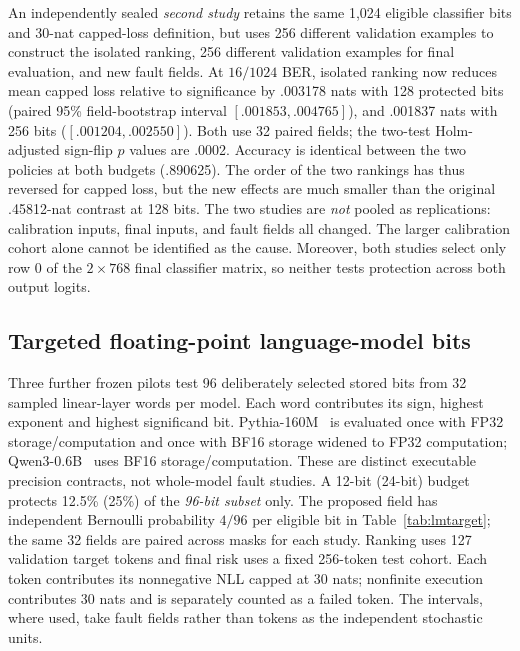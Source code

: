 An independently sealed \emph{second study} retains the same 1,024 eligible
classifier bits and 30-nat capped-loss definition, but uses 256 different
validation examples to construct the isolated ranking, 256 different validation
examples for final evaluation, and new fault fields. At $16/1024$ BER, isolated
ranking now reduces mean capped loss relative to significance by .003178 nats
with 128 protected bits (paired 95\% field-bootstrap interval
$[.001853,.004765]$), and .001837 nats with 256 bits
($[.001204,.002550]$). Both use 32 paired fields; the two-test Holm-adjusted
sign-flip $p$ values are .0002. Accuracy is identical between the two policies
at both budgets (.890625). The order of the two rankings has thus reversed
for capped loss, but the new effects are much smaller than the original
.45812-nat contrast at 128 bits. The two studies are \emph{not} pooled as
replications: calibration inputs, final inputs, and fault fields all changed.
The larger calibration cohort alone cannot be identified as the cause.
Moreover, both studies select only row 0 of the $2\times768$ final classifier
matrix, so neither tests protection across both output logits.

\subsection{Targeted floating-point language-model bits}
\label{sec:targetedlm}
Three further frozen pilots test 96 deliberately selected stored bits from 32
sampled linear-layer words per model. Each word contributes its sign, highest
exponent and highest significand bit. Pythia-160M~\cite{biderman2023pythia} is evaluated once with FP32
storage/computation and once with BF16 storage widened to FP32 computation;
Qwen3-0.6B~\cite{yang2025qwen3} uses BF16 storage/computation. These are distinct executable
precision contracts, not whole-model fault studies. A 12-bit (24-bit) budget
protects 12.5\% (25\%) of the \emph{96-bit subset} only. The proposed field
has independent Bernoulli probability $4/96$ per eligible bit in Table~\ref{tab:lmtarget};
the same 32 fields are paired across masks for each study. Ranking uses 127
validation target tokens and final risk uses a fixed 256-token test cohort.
Each token contributes its nonnegative NLL capped at 30 nats; nonfinite
execution contributes 30 nats and is separately counted as a failed token.
The intervals, where used, take fault fields rather than tokens as the
independent stochastic units.

